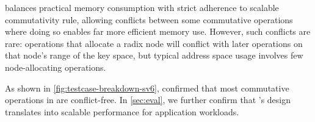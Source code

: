 \vm balances practical memory consumption with strict adherence to
scalable commutativity rule, allowing conflicts between some
commutative operations where doing so enables far more efficient
memory use.  However, such conflicts are rare: operations that
allocate a radix node will conflict with later operations on that
node's range of the key space, but typical address space usage
involves few node-allocating operations.

As shown in \cref{fig:testcase-breakdown-sv6}, \tool confirmed that
most commutative operations in \vm are conflict-free.  In
\cref{sec:eval}, we further confirm that \vm's design translates into
scalable performance for application workloads.
